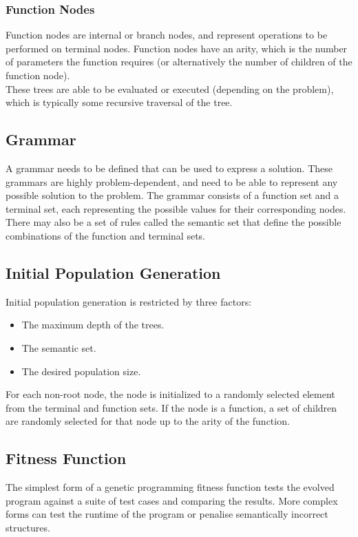 \documentclass[conference]{IEEEtran}
\begin{document}
\subsubsection{Function Nodes}
Function nodes are internal or branch nodes, and represent operations to be performed on terminal nodes. Function nodes have an arity, which is the number of parameters the function requires (or alternatively the number of children of the function node).\\

These trees are able to be evaluated or executed (depending on the problem), which is typically some recursive traversal of the tree.

\subsection{Grammar}
A grammar needs to be defined that can be used to express a solution. These grammars are highly problem-dependent, and need to be able to represent any possible solution to the problem. The grammar consists of a function set and a terminal set, each representing the possible values for their corresponding nodes. There may also be a set of rules called the semantic set that define the possible combinations of the function and terminal sets.

\subsection{Initial Population Generation}
Initial population generation is restricted by three factors:
\begin{itemize}
  \item The maximum depth of the trees.
  \item The semantic set.
  \item The desired population size.
\end{itemize}

For each non-root node, the node is initialized to a randomly selected element from the terminal and function sets. If the node is a function, a set of children are randomly selected for that node up to the arity of the function.

\subsection{Fitness Function}
The simplest form of a genetic programming fitness function tests the evolved program against a suite of test cases and comparing the results. More complex forms can test the runtime of the program or penalise semantically incorrect structures.
\end{document}

